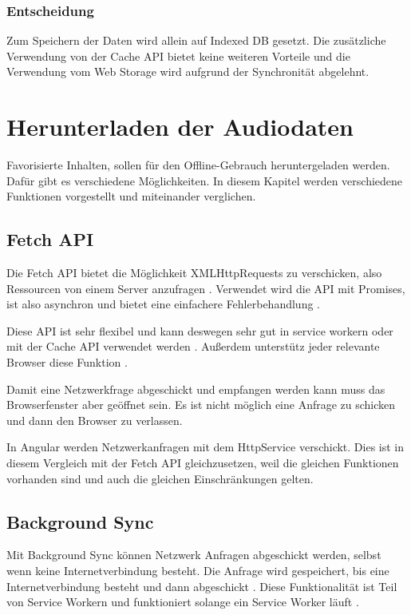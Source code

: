 \subsubsection{Entscheidung}
Zum Speichern der Daten wird allein auf Indexed DB gesetzt. Die zusätzliche Verwendung von der Cache \ac{API} bietet keine weiteren Vorteile und die Verwendung vom Web Storage wird aufgrund der Synchronität abgelehnt.  

\clearpage

\section{Herunterladen der Audiodaten}
Favorisierte Inhalten, sollen für den Offline-Gebrauch heruntergeladen werden. Dafür gibt es verschiedene Möglichkeiten. In diesem Kapitel werden verschiedene Funktionen vorgestellt und miteinander verglichen. 

\subsection{Fetch API}
Die Fetch \ac{API} bietet die Möglichkeit XMLHttpRequests zu verschicken, also Ressourcen von einem Server anzufragen \autocite{Rojas2020}. Verwendet wird die \ac{API} mit Promises, ist also asynchron und bietet eine einfachere Fehlerbehandlung \autocite{Rojas2020} \autocite{mdn-fetch}. 

Diese \ac{API} ist sehr flexibel und kann deswegen sehr gut in service workern oder mit der Cache \ac{API} verwendet werden \autocite{mdn-fetch}. Außerdem unterstütz jeder relevante Browser diese Funktion \autocite{mdn-fetch}. 

Damit eine Netzwerkfrage abgeschickt und empfangen werden kann muss das Browserfenster aber geöffnet sein. Es ist nicht möglich eine Anfrage zu schicken und dann den Browser zu verlassen.

In Angular werden Netzwerkanfragen mit dem HttpService verschickt. Dies ist in diesem Vergleich mit der Fetch \ac{API} gleichzusetzen, weil die gleichen Funktionen vorhanden sind und auch die gleichen Einschränkungen gelten.

\subsection{Background Sync}
Mit Background Sync können Netzwerk Anfragen abgeschickt werden, selbst wenn keine Internetverbindung besteht. Die Anfrage wird gespeichert, bis eine Internetverbindung besteht und dann abgeschickt \autocite{wicg-background-sync}. Diese Funktionalität ist Teil von Service Workern und funktioniert solange ein Service Worker läuft \autocite{wicg-background-sync}. 

